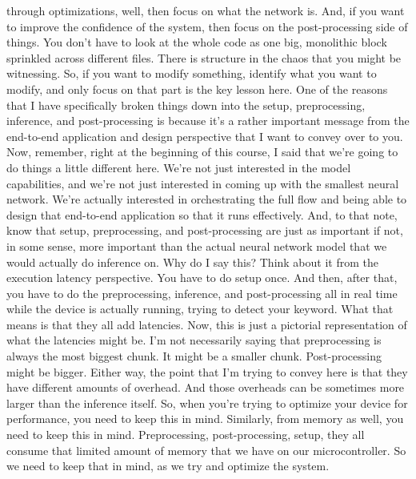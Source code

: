      through optimizations, well, then focus on what the network is.
     And, if you want to improve the confidence of the system,
     then focus on the post-processing side of things.
     You don't have to look at the whole code as one big, monolithic block
     sprinkled across different files.
     There is structure in the chaos that you might be witnessing.
     So, if you want to modify something, identify
     what you want to modify, and only focus on that part is the key lesson here.
     One of the reasons that I have specifically broken things down
     into the setup, preprocessing, inference, and post-processing
     is because it's a rather important message from the end-to-end application
     and design perspective that I want to convey over to you.
     Now, remember, right at the beginning of this course,
     I said that we're going to do things a little different here.
     We're not just interested in the model capabilities,
     and we're not just interested in coming up with the smallest neural network.
     We're actually interested in orchestrating the full flow
     and being able to design that end-to-end application
     so that it runs effectively.
     And, to that note, know that setup, preprocessing, and post-processing
     are just as important if not, in some sense,
     more important than the actual neural network model
     that we would actually do inference on.
     Why do I say this?
     Think about it from the execution latency perspective.
     You have to do setup once.
     And then, after that, you have to do the preprocessing, inference,
     and post-processing all in real time while the device is actually running,
     trying to detect your keyword.
     What that means is that they all add latencies.
     Now, this is just a pictorial representation
     of what the latencies might be.
     I'm not necessarily saying that preprocessing is always
     the most biggest chunk.
     It might be a smaller chunk.
     Post-processing might be bigger.
     Either way, the point that I'm trying to convey here
     is that they have different amounts of overhead.
     And those overheads can be sometimes more larger than the inference itself.
     So, when you're trying to optimize your device for performance,
     you need to keep this in mind.
     Similarly, from memory as well, you need to keep this in mind.
     Preprocessing, post-processing, setup, they all
     consume that limited amount of memory that we have on our microcontroller.
     So we need to keep that in mind, as we try and optimize the system.
